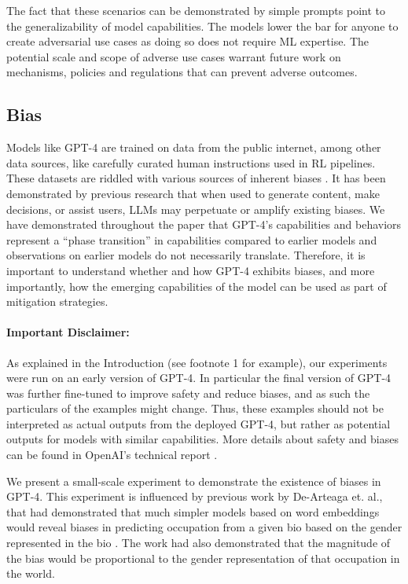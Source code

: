         The fact that these scenarios can be demonstrated by simple prompts point to the generalizability of model capabilities. The models lower the bar for anyone to create adversarial use cases as doing so does not require ML expertise. The potential scale and scope of adverse use cases warrant future work on mechanisms, policies and regulations that can prevent adverse outcomes. 

\subsection{Bias}
\label{sec:societal_bias}

Models like GPT-4 are trained on data from the public internet, among other data sources, like carefully curated human instructions used in RL pipelines. These datasets are riddled with various sources of inherent biases \cite{bender2021dangers, blodgett2020language, hovy2016social, bordia2019identifying}. It has been demonstrated by previous research that when used to generate content, make decisions, or assist users, LLMs may perpetuate or amplify existing biases. We have demonstrated throughout the paper that GPT-4's capabilities and behaviors represent a ``phase transition'' in capabilities compared to earlier models and observations on earlier models do not necessarily translate. Therefore, it is important to understand whether and how GPT-4 exhibits biases, and more importantly, how the emerging capabilities of the model can be used as part of mitigation strategies. 

\paragraph{Important Disclaimer:} As explained in the Introduction (see footnote 1 for example), our experiments were run on an early version of GPT-4. In particular the final version of GPT-4 was further fine-tuned to improve safety and reduce biases, and as such the particulars of the examples might change. Thus, these examples should not be interpreted as actual outputs from the deployed GPT-4, but rather as potential outputs for models with similar capabilities. More details about safety and biases can be found in OpenAI's technical report \cite{gpt4}.

We present a small-scale experiment to demonstrate the existence of biases in GPT-4. This experiment is influenced by previous work by De-Arteaga et. al., that had demonstrated that much simpler models based on word embeddings would reveal biases in predicting occupation from a given bio based on the gender represented in the bio \cite{de2019bias}. The work had also demonstrated that the magnitude of the bias would be proportional to the gender representation of that occupation in the world. 

